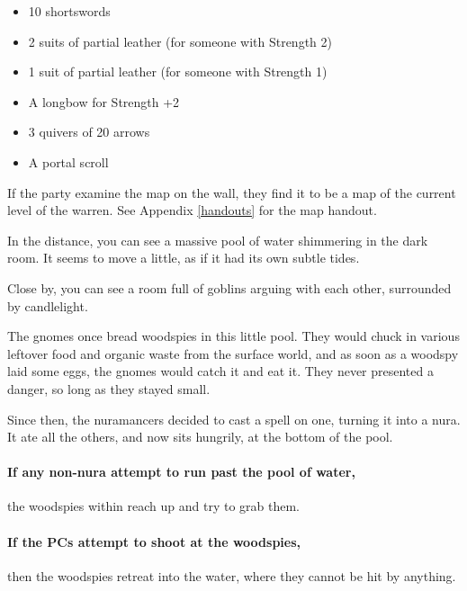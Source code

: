 \begin{multicols}{2}
\begin{itemize}
	\item{10 shortswords}
	\item{2 suits of partial leather (for someone with Strength 2)}
	\item{1 suit of partial leather (for someone with Strength 1)}
	\item{A longbow for Strength +2}
	\item{3 quivers of 20 arrows}
	\item{A portal scroll}

\end{itemize}

If the party examine the map on the wall, they find it to be a map of the current level of the warren.
See Appendix \ref{handouts} for the map handout.


\begin{boxtext}

	In the distance, you can see a massive pool of water shimmering in the dark room.
	It seems to move a little, as if it had its own subtle tides.

	Close by, you can see a room full of goblins arguing with each other, surrounded by candlelight.

\end{boxtext}

\begin{exampletext}

	The gnomes once bread woodspies in this little pool.
	They would chuck in various leftover food and organic waste from the surface world, and as soon as a woodspy laid some eggs, the gnomes would catch it and eat it.
	They never presented a danger, so long as they stayed small.

	Since then, the nuramancers decided to cast a spell on one, turning it into a nura.
	It ate all the others, and now sits hungrily, at the bottom of the pool.

\end{exampletext}


\paragraph{If any non-nura attempt to run past the pool of water,}
the woodspies within reach up and try to grab them.

\paragraph{If the PCs attempt to shoot at the woodspies,}
then the woodspies retreat into the water, where they cannot be hit by anything.


\end{multicols}
